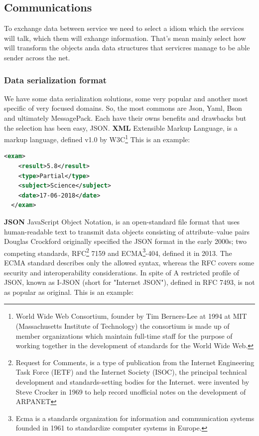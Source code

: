 \subsection{Communications}

To exchange data between service we need to select a idiom which the services
will talk, which them will exhange information. That's mean mainly select how
will transform the objects anda data structures that servicres manage to be able
sender across the net.

\subsubsection{Data serialization format}

We have some data serialization solutions, some very popular and another most
specific of very focused domains. So, the most commons are Json, Yaml,
Bson and ultimately MessagePack. Each have their owns benefits and drawbacks but
the selection has been easy, JSON.
\intro
\textbf{XML}
\intro
Extensible Markup Language, is a markup language, defined v1.0 by
W3C\footnote{World Wide Web Consortium, founder by Tim Berners-Lee at 1994 at MIT
(Massachusetts Institute of Technology) the consortium is made up of member
organizations which maintain full-time staff for the purpose of working together
in the development of standards for the World Wide Web.} This is an example:

\begin{lstlisting}[language=xml,frame=none,numbers=none]
  <exam>
    <result>5.8</result>
    <type>Partial</type>
    <subject>Science</subject>
    <date>17-06-2018</date>
  </exam>
\end{lstlisting}


\noindent \textbf{JSON}
\intro
JavaScript Object Notation, is an open-standard file format that uses
human-readable text to transmit data objects consisting of attribute–value pairs
Douglas Crockford originally specified the JSON format in the early 2000s;
two competing standards, RFC\footnote{ Request for Comments, is a type of
publication from the Internet Engineering Task Force (IETF) and the Internet
Society (ISOC), the principal technical development and standards-setting bodies
for the Internet. were invented by Steve Crocker in 1969 to help record
unofficial notes on the development of ARPANET} 7159 and ECMA\footnote{Ecma is a
standards organization for information and communication systems founded in 1961
to standardize computer systems in Europe.}-404, defined it in 2013.
The ECMA standard describes only the allowed syntax, whereas the RFC covers some
 security and interoperability considerations.
\intro
In spite of A restricted profile of JSON, known as I-JSON (short for "Internet JSON"),
defined in RFC 7493, is not as popular as original. This is an example:

